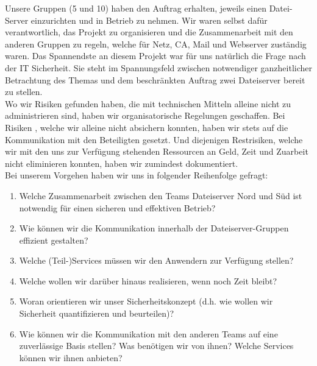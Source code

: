 Unsere Gruppen (5 und 10) haben den Auftrag erhalten, jeweils einen Datei-Server einzurichten und in Betrieb zu nehmen. Wir waren selbst dafür verantwortlich, das Projekt zu organisieren und die Zusammenarbeit mit den anderen Gruppen zu regeln, welche für Netz, CA, Mail und Webserver zuständig waren. Das Spannendste an diesem Projekt war für uns natürlich die Frage nach der IT Sicherheit. Sie steht im Spannungsfeld zwischen notwendiger ganzheitlicher Betrachtung des Themas und dem beschränkten Auftrag zwei Dateiserver bereit zu stellen.\\

Wo wir Risiken gefunden haben, die mit technischen Mitteln alleine nicht zu administrieren sind, haben wir organisatorische Regelungen geschaffen. Bei Risiken , welche wir alleine nicht absichern konnten, haben wir stets auf die Kommunikation mit den Beteiligten gesetzt. Und diejenigen Restrisiken, welche wir mit den uns zur Verfügung stehenden Ressourcen an Geld, Zeit und Zuarbeit nicht eliminieren konnten, haben wir zumindest dokumentiert.\\

Bei unserem Vorgehen haben wir uns in folgender Reihenfolge gefragt:

\begin{enumerate}
\item Welche Zusammenarbeit zwischen den Teams Dateiserver Nord und Süd ist \newline notwendig für einen sicheren und effektiven Betrieb?
\item Wie können wir die Kommunikation innerhalb der Dateiserver-Gruppen effizient \newline gestalten?
\item Welche (Teil-)Services müssen wir den Anwendern zur Verfügung stellen?
\item Welche wollen wir darüber hinaus realisieren, wenn noch Zeit bleibt?
\item Woran orientieren wir unser Sicherheitskonzept
(d.h. wie wollen wir Sicherheit \newline quantifizieren und beurteilen)?
\item Wie können wir die Kommunikation mit den anderen Teams auf eine zuverlässige Basis stellen? Was benötigen wir von ihnen? Welche Services können wir ihnen anbieten?
\end{enumerate}


